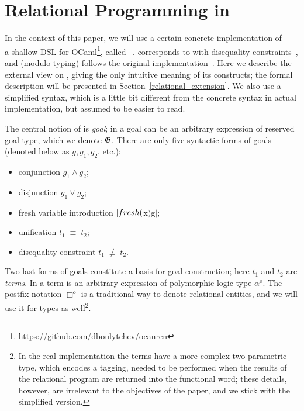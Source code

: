 \section{Relational Programming in \miniKanren}
\label{ocanren}

In the context of this paper, we will use a certain concrete implementation of \miniKanren~--- a shallow DSL for 
OCaml\footnote{https://github.com/dboulytchev/ocanren}, called \ocanren~\cite{ocanren}. \ocanren corresponds to \miniKanren with
disequality constraints~\cite{CKanren}, and (modulo typing) follows the original implementation~\cite{MicroKanren,SmallEmbedding}. Here we describe the external view 
on \ocanren, giving the only intuitive meaning of its constructs; the formal description will be presented in Section~\ref{relational_extension}.
We also use a simplified syntax, which is a little bit different from the concrete syntax in actual implementation, but assumed to
be easier to read.

The central notion of \miniKanren is \emph{goal}; in \ocanren a goal can be an arbitrary expression of reserved goal type, which we denote $\mathfrak G$.
There are only five syntactic forms of goals (denoted below as $g, g_1, g_2$, etc.):

\begin{itemize}
  \item conjunction $g_1\wedge g_2$;
  \item disjunction $g_1\vee g_2$;
  \item fresh variable introduction $\lstinline|fresh ($x$) $\;g$|$;
  \item unification $t_1\;\equiv\;t_2$;
  \item disequality constraint $t_1\;\not\equiv\;t_2$.
\end{itemize}

Two last forms of goals constitute a basis for goal construction; here $t_1$ and $t_2$ are \emph{terms}. In \ocanren a term is an arbitrary expression of polymorphic logic type $\alpha^o$. The postfix notation $\Box^o$ is a traditional way to denote relational entities, and we will use it for types as well\footnote{In the real implementation the terms have a more complex two-parametric type, which encodes a tagging, needed to be performed when the results of the relational program are returned into the functional word; these details, however, are irrelevant to the objectives of the paper, and we stick with the simplified version.}.

